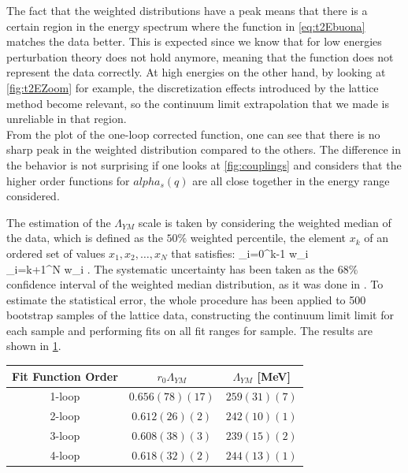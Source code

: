 The fact that the weighted distributions have a peak means that there is a certain region in the energy spectrum where the function in \cref{eq:t2Ebuona} matches the data better. This is expected since we know that for low energies perturbation theory does not hold anymore, meaning that the function does not represent the data correctly. At high energies on the other hand, by looking at \cref{fig:t2EZoom} for example, the discretization effects introduced by the lattice method become relevant, so the continuum limit extrapolation that we made is unreliable in that region.\\
From the plot of the one-loop corrected function, one can see that there is no sharp peak in the weighted distribution compared to the others. The difference in the behavior is not surprising if one looks at \cref{fig:couplings} and considers that the higher order functions for $alpha_s(q)$ are all close together in the energy range considered. 

The estimation of the $\Lambda_{YM}$ scale is taken by considering the weighted median of the data, which is defined as the $50\%$ weighted percentile, the element $x_k$ of an ordered set of values $x_1, x_2, \dots, x_N$ that satisfies:
\beq
    \sum_{i=0}^{k-1} w_i \leq {} ~~~~   ~~~~~ \sum_{i=k+1}^{N} w_i \geq {}.
\eeq
The systematic uncertainty has been taken as the $68\%$ confidence interval of the weighted median distribution, as it was done in \cite{durr_ab-initio_2008-1}. To estimate the statistical error, the whole procedure has been applied to 500 bootstrap samples of the lattice data, constructing the continuum limit limit for each sample and performing fits on all fit ranges for sample. The results are shown in \cref{table:lambda_table}.

\begin{table}[!htb]
    \begin{center}
        \begin{tabular}{ccc} 
            Fit Function Order & $r_0\Lambda_{YM}$ & $\Lambda_{YM}$ [MeV] \\\hline
            1-loop & $0.656(78)(17)$ & $259(31)(7)$ \\
            2-loop & $0.612(26)(2)$ & $242(10)(1)$  \\
            3-loop & $0.608(38)(3)$ & $239(15)(2)$  \\
            4-loop & $0.618(32)(2)$ & $244(13)(1)$  
        \end{tabular}
        \label{table:lambda_table} 
    \end{center} 
\end{table}

